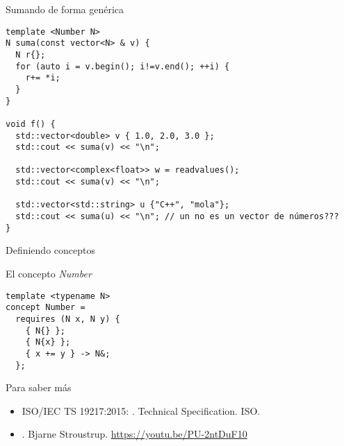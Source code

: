 \begin{frame}[t,fragile]
\begin{block}{Sumando de forma genérica}
\begin{lstlisting}
template <Number N>
N suma(const vector<N> & v) {
  N r{};
  for (auto i = v.begin(); i!=v.end(); ++i) {
    r+= *i;
  }
}

void f() {
  std::vector<double> v { 1.0, 2.0, 3.0 };
  std::cout << suma(v) << "\n";

  std::vector<complex<float>> w = readvalues();
  std::cout << suma(v) << "\n";

  std::vector<std::string> u {"C++", "mola"};
  std::cout << suma(u) << "\n"; // un no es un vector de números???
}
\end{lstlisting}
\end{block}
\end{frame}

\begin{frame}[t,fragile]{Definiendo conceptos}
\begin{block}{El concepto \emph{Number}}
\begin{lstlisting}
template <typename N>
concept Number =
  requires (N x, N y) {
    { N{} };
    { N{x} };
    { x += y } -> N&;
  };
\end{lstlisting}
\end{block}
\end{frame}

\begin{frame}[t]{Para saber más}
\begin{itemize}
  \item ISO/IEC TS 19217:2015: .
        Technical Specification.
        ISO.

  \vfill
  \item {}.
        Bjarne Stroustrup.
        \url{https://youtu.be/PU-2ntDuF10}
\end{itemize}
\end{frame}
